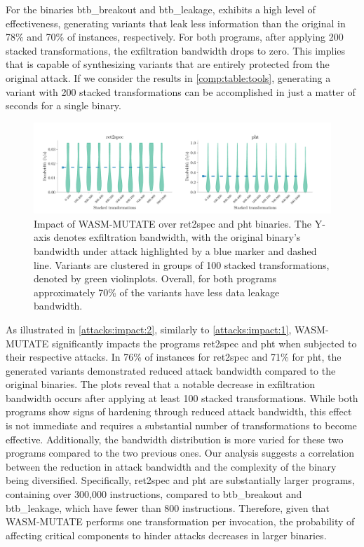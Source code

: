  For the binaries btb\_breakout and btb\_leakage, \tool exhibits a high level of effectiveness, generating variants that leak less information than the original in 78\% and 70\% of instances, respectively.
For both programs, after applying 200 stacked transformations, the exfiltration bandwidth drops to zero.
This implies that \tool is capable of synthesizing variants that are entirely protected from the original attack.
If we consider the results in \autoref{comp:table:tools}, generating a variant with 200 stacked transformations can be accomplished in just a matter of seconds for a single \Wasm binary.

\begin{figure}[h]
    \centering    
    \includegraphics[width=\linewidth]{plots/spectre/results.rq3.2.pdf}
    \caption{Impact of WASM-MUTATE over ret2spec and pht binaries. The Y-axis denotes exfiltration bandwidth, with the original binary's bandwidth under attack highlighted by a blue marker and dashed line. Variants are clustered in groups of 100 stacked transformations, denoted by green violinplots. 
    Overall, for both programs approximately 70\% of the variants have less data leakage bandwidth.}
  \label{attacks:impact:2}
\end{figure}


\begin{strategy}
    As illustrated in \autoref{attacks:impact:2}, similarly to \autoref{attacks:impact:1}, WASM-MUTATE significantly impacts the programs ret2spec and pht when subjected to their respective attacks. 
    In 76\% of instances for ret2spec and 71\% for pht, the generated variants demonstrated reduced attack bandwidth compared to the original binaries.
    The plots reveal that a notable decrease in exfiltration bandwidth occurs after applying at least 100 stacked transformations. 
    While both programs show signs of hardening through reduced attack bandwidth, this effect is not immediate and requires a substantial number of transformations to become effective. 
    Additionally, the bandwidth distribution is more varied for these two programs compared to the two previous ones.
    Our analysis suggests a correlation between the reduction in attack bandwidth and the complexity of the binary being diversified. 
    Specifically, ret2spec and pht are substantially larger programs, containing over 300,000 instructions, compared to btb\_breakout and btb\_leakage, which have fewer than 800 instructions. 
    Therefore, given that WASM-MUTATE performs one transformation per invocation, the probability of affecting critical components to hinder attacks decreases in larger binaries.
\end{strategy}




